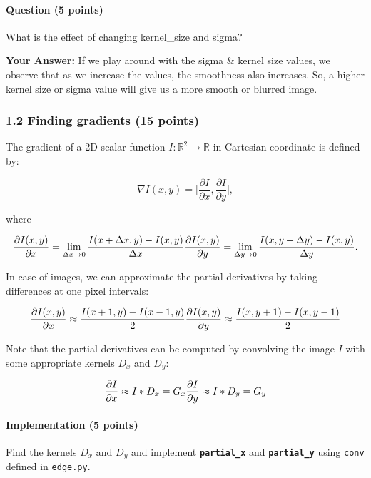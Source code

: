 \documentclass[11pt]{article}
\begin{document}
    \paragraph{Question (5 points)}\label{question-5-points}

What is the effect of changing kernel\_size and sigma?

    \textbf{Your Answer:} If we play around with the sigma \& kernel size
values, we observe that as we increase the values, the smoothness also
increases. So, a higher kernel size or sigma value will give us a more
smooth or blurred image.

    \subsubsection{1.2 Finding gradients (15
points)}\label{finding-gradients-15-points}

The gradient of a 2D scalar function
\(I:\mathbb{R}^2\rightarrow{\mathbb{R}}\) in Cartesian coordinate is
defined by:

\[\nabla{I(x,y)}=\bigl[\frac{\partial{I}}{\partial{x}},\frac{\partial{I}}{\partial{y}}\bigr],\]

where

\[
\frac{\partial{I(x,y)}}{\partial{x}}=\lim_{\Delta{x}\to{0}}\frac{I(x+\Delta{x},y)-I(x,y)}{\Delta{x}} \\
\frac{\partial{I(x,y)}}{\partial{y}}=\lim_{\Delta{y}\to{0}}\frac{I(x,y+\Delta{y})-I(x,y)}{\Delta{y}}.
\]

In case of images, we can approximate the partial derivatives by taking
differences at one pixel intervals:

\[
\frac{\partial{I(x,y)}}{\partial{x}}\approx{\frac{I(x+1,y)-I(x-1,y)}{2}} \\
\frac{\partial{I(x,y)}}{\partial{y}}\approx{\frac{I(x,y+1)-I(x,y-1)}{2}}
\]

Note that the partial derivatives can be computed by convolving the
image \(I\) with some appropriate kernels \(D_x\) and \(D_y\):

\[
\frac{\partial{I}}{\partial{x}}\approx{I*D_x}=G_x \\
\frac{\partial{I}}{\partial{y}}\approx{I*D_y}=G_y
\]

    \paragraph{Implementation (5 points)}\label{implementation-5-points}

Find the kernels \(D_x\) and \(D_y\) and implement
\textbf{\texttt{partial\_x}} and \textbf{\texttt{partial\_y}} using
\texttt{conv} defined in \texttt{edge.py}.
\end{document}
